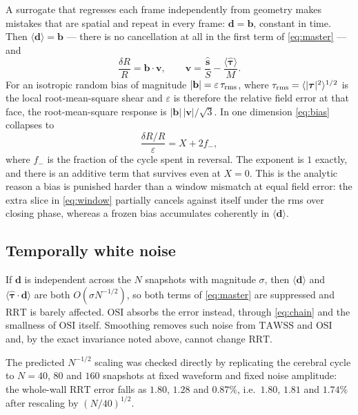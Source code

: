 \documentclass[11pt,a4paper]{article}
\newcommand{\TAWSS}{\mathrm{TAWSS}}
\newcommand{\OSI}{\mathrm{OSI}}
\newcommand{\RRT}{\mathrm{RRT}}
\newcommand{\eps}{\varepsilon}
\begin{document}
A surrogate that regresses each frame independently from geometry makes
mistakes that are spatial and repeat in every frame: $\mathbf d=\mathbf b$,
constant in time. Then $\langle\mathbf d\rangle=\mathbf b$ --- there is no
cancellation at all in the first term of \eqref{eq:master} --- and
\begin{equation}
\frac{\delta R}{R}=\mathbf b\cdot\mathbf v,
\qquad
\mathbf v=\frac{\hat{\mathbf s}}{S}-\frac{\langle\hat{\boldsymbol\tau}\rangle}{M}.
\label{eq:bias}
\end{equation}
For an isotropic random bias of magnitude $|\mathbf b|=\eps\,\tau_{\rm rms}$,
where $\tau_{\rm rms}=\langle|\boldsymbol\tau|^2\rangle^{1/2}$ is the local
root-mean-square shear and $\eps$ is therefore the relative field error at
that face, the root-mean-square response is $|\mathbf b|\,|\mathbf v|/\sqrt3$. In one
dimension \eqref{eq:bias} collapses to
\begin{equation}
\frac{\delta R/R}{\eps}=X+2f_-,
\label{eq:bias1d}
\end{equation}
where $f_-$ is the fraction of the cycle spent in reversal. The exponent is
$1$ exactly, and there is an additive term that survives even at $X=0$. This
is the analytic reason a bias is punished harder than a window mismatch at
equal field error: the extra slice in \eqref{eq:window} partially cancels
against itself under the rms over closing phase, whereas a frozen bias
accumulates coherently in $\langle\mathbf d\rangle$.

\subsection{Temporally white noise}
\label{sec:noise}

If $\mathbf d$ is independent across the $N$ snapshots with magnitude
$\sigma$, then $\langle\mathbf d\rangle$ and
$\langle\hat{\boldsymbol\tau}\cdot\mathbf d\rangle$ are both
$O(\sigma N^{-1/2})$, so both terms of \eqref{eq:master} are suppressed and
$\RRT$ is barely affected. $\OSI$ absorbs the error instead, through
\eqref{eq:chain} and the smallness of $\OSI$ itself. Smoothing removes such
noise from $\TAWSS$ and $\OSI$ and, by the exact invariance noted above,
cannot change $\RRT$.

The predicted $N^{-1/2}$ scaling was checked directly by replicating the
cerebral cycle to $N=40$, $80$ and $160$ snapshots at fixed waveform and
fixed noise amplitude: the whole-wall $\RRT$ error falls as $1.80$, $1.28$
and $0.87\%$, i.e.\ $1.80$, $1.81$ and $1.74\%$ after rescaling by
$(N/40)^{1/2}$.
\end{document}
